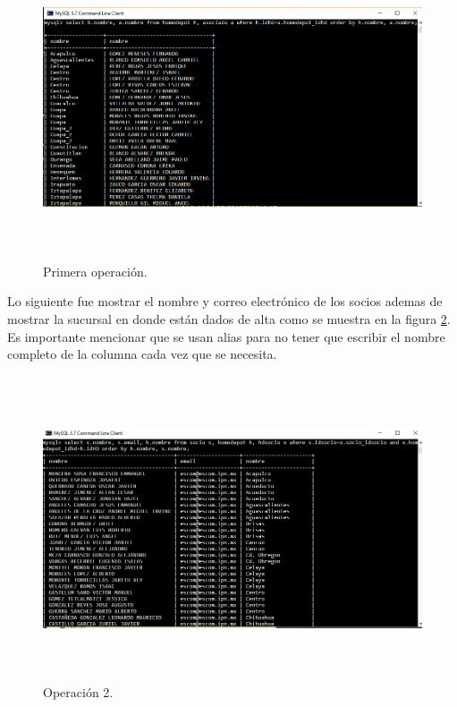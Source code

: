\documentclass[12pt, titlepage]{article}
\begin{document}
 \begin{figure}[H]
	\begin{center}
		\includegraphics[width=16cm, height=9cm]{img/comando1.png}
		\caption{Primera operación.}
		\label{fig:comando1}
	\end{center}
\end{figure}
Lo siguiente fue mostrar el nombre y correo electrónico de los socios ademas de mostrar la sucursal en donde están dados de alta como se muestra en la figura \ref{fig:comando2}. Es importante mencionar que se usan alias para no tener que escribir el nombre completo de la columna cada vez que se necesita.
 \begin{figure}[H]
	\begin{center}
		\includegraphics[width=16cm, height=9cm]{img/comando2.png}
		\caption{Operación 2.}
		\label{fig:comando2}
	\end{center}
\end{figure}
\end{document}
